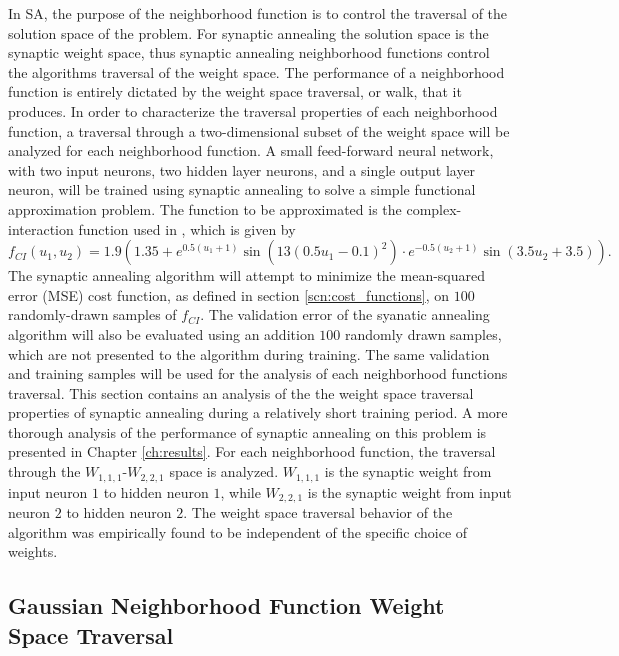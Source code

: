 \documentclass[11pt]{afthesis}
\begin{document}
	In SA, the purpose of the neighborhood function is to control the traversal of the solution space of the problem. For synaptic annealing the solution space is the synaptic weight space, thus synaptic annealing neighborhood functions control the algorithms traversal of the weight space. The performance of a neighborhood function is entirely dictated by the weight space traversal, or walk, that it produces. In order to characterize the traversal properties of each neighborhood function, a traversal through a two-dimensional subset of the weight space will be analyzed for each neighborhood function. A small feed-forward neural network, with two input neurons, two hidden layer neurons, and a single output layer neuron, will be trained using synaptic annealing to solve a simple functional approximation problem. The function to be approximated is the complex-interaction function used in \cite{lee2007improvinggeneralizationcapabilitynnusingsa}, which is given by \begin{equation}
	f_{CI}(u_1,u_2) = 1.9(1.35 + e^{0.5(u_1+1)} \sin ( 13 (0.5 u_1 - 0.1 )^2 ) · e^{−0.5(u_2+1)} \sin(3.5u_2 + 3.5)).
	\end{equation}
	The synaptic annealing algorithm will attempt to minimize the mean-squared error (MSE) cost function, as defined in section \ref{scn:cost_functions}, on $100$ randomly-drawn samples of $f_{CI}$. The validation error of the syanatic annealing algorithm will also be evaluated using an addition $100$ randomly drawn samples, which are not presented to the algorithm during training. The same validation and training samples will be used for the analysis of each neighborhood functions traversal.  This section contains an analysis of the the weight space traversal properties of synaptic annealing during a relatively short training period. A more thorough analysis of the performance of synaptic annealing on this problem is presented in Chapter \ref{ch:results}. For each neighborhood function, the traversal through the $W_{1,1,1}$-$W_{2,2,1}$ space is analyzed. $W_{1,1,1}$ is the synaptic weight from input neuron $1$ to hidden neuron $1$, while $W_{2,2,1}$ is the synaptic weight from input neuron $2$ to hidden neuron $2$. The weight space traversal behavior of the algorithm was empirically found to be independent of the specific choice of weights.
	
	
	

	\subsection{Gaussian Neighborhood Function Weight Space Traversal} 
	
\end{document}
